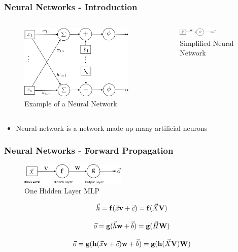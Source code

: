 \documentclass{beamer}
\begin{document}
\begin{frame}
\frametitle{Neural Networks - Introduction}
\begin{columns}
\begin{figure}[t!]
    \centering
    \includegraphics[width=\textwidth]{../paper/pictures/figures/detail_NN.png}
    \caption{Example of a Neural Network}
    \label{fig:detail_NN}
\end{figure}

\begin{figure}[t!]
    \centering
    \includegraphics[width=0.6\textwidth]{../paper/pictures/figures/NN.png}
    \caption{Simplified Neural Network}
    \label{fig:NN}
\end{figure}
\end{columns}

\begin{itemize}
\item Neural network is a network made up many artificial neurons
\end{itemize}
\end{frame}

\begin{frame}
\frametitle{Neural Networks - Forward Propagation}
\begin{figure}[t!]
    \centering
    \includegraphics[width=0.45\textwidth]{../paper/pictures/figures/MLP.png}
    \caption{One Hidden Layer MLP}
    \label{fig:MLP}
\end{figure}

$$\vec{h} = \bold{f}(\vec{x}\bold{v}+\vec{c}) = \bold{f}(\vec{X}\bold{V})$$

$$\vec{o} = \bold{g}(\vec{h}\bold{w}+\vec{b}) = \bold{g}(\vec{H}\bold{W})$$

$$\vec{o} = \bold{g}(\bold{h}(\vec{x}\bold{v}+\vec{c})\bold{w}+\vec{b}) = \bold{g}(\bold{h}(\vec{X}\bold{V})\bold{W})$$
\end{frame}
\end{document}
